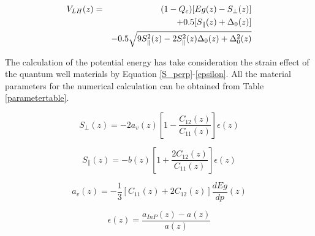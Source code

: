 \documentclass{ZJUthesis}
\begin{document}
\begin{eqnarray}
    \label{V_LH}
    V_{LH}(z)&=& (1-Q_c)[Eg(z) - S_\perp(z)] \notag\\
    && +0.5[S_\parallel(z) + \Delta_0(z)] \notag\\
    && -0.5 \sqrt{9S_\parallel^2(z)-2S_\parallel^2(z)\Delta_0(z)+\Delta_0^2(z)}
\end{eqnarray}

The calculation of the potential energy has take consideration the strain effect of the quantum well materials by Equation \ref{S_perp}-\ref{epsilon}. All the material parameters for the numerical calculation can be obtained from Table \ref{parametertable}.

\begin{equation}
    \label{S_perp}
    S_\perp(z)
        = -2a_v(z)[1-\frac{C_{12}(z)}{C_{11}(z)}] \epsilon(z)
\end{equation}

\begin{equation}\label{S_parallel}
    S_\parallel(z)
        = -b(z)[1+\frac{2C_{12}(z)}{C_{11}(z)}] \epsilon(z)
\end{equation}

\begin{equation}\label{a_v}
    a_v(z)
        = -\frac{1}{3}[C_{11}(z)+2C_{12}(z)] \frac{dEg}{dp}(z)
\end{equation}

\begin{equation}\label{epsilon}
    \epsilon(z)
        = \frac{a_{InP}(z)-a(z)}{a(z)}
\end{equation}
\end{document}
